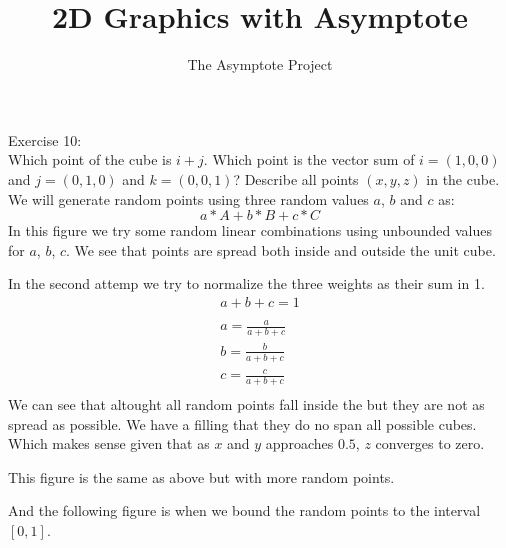 \documentclass[12pt]{article}
\title{2D Graphics with Asymptote}
\author{The Asymptote Project}
\newcommand{\insertrep}[1]{%
	\hspace*{-2.4cm}
	\fbox{\texttt{[image: \#1]}}
}
\begin{document}
	Exercise 10:\\
	Which point of the cube is $i+j$. Which point is the vector sum of $i=(1,0,0)$ and $j=(0,1,0)$ and $k=(0,0,1)$? Describe all points $(x,y,z)$ in the cube.\\
	We will generate random points using three random values $a$, $b$ and $c$ as:
	$$a*A+b*B+c*C$$
	In this figure we try some random linear combinations using unbounded values for $a$, $b$, $c$. We see that points are spread both inside and outside the unit cube.\\
	\begin{center}
		\insertrep{exercise01010a.pdf}
	\end{center}
	In the second attemp we try to normalize the three weights as their sum in 1.\\
	\begin{align*}
		a + b + c = 1\\
		\\
		a = \frac{a}{a+b+c}\\
		b = \frac{b}{a+b+c}\\
		c = \frac{c}{a+b+c}\\				
	\end{align*}
	We can see that altought all random points fall inside the but they are not as spread as possible. We have a filling that they do no span all possible cubes. Which makes sense given that as $x$ and $y$ approaches $0.5$, $z$ converges to zero.	
	\begin{center}
		\insertrep{exercise01010b1.pdf}
	\end{center}
	This figure is the same as above but with more random points.
	\begin{center}
		\insertrep{exercise01010b2.pdf}
	\end{center}
	\newpage
	And the following figure is when we bound the random points to the interval $[0,1]$.
	\begin{center}
		\insertrep{exercise01010c.pdf}
	\end{center}	
\end{document}
